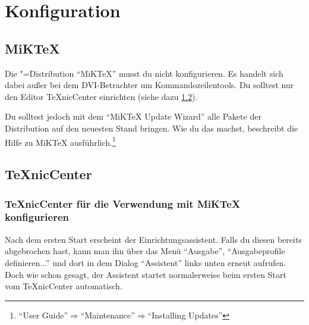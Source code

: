 %
%

\chapter{Konfiguration}

\section{MiKTeX}

Die \DMLLaTeX"=Distribution \enquote{MiKTeX} musst du nicht konfigurieren. Es handelt sich dabei außer bei dem DVI-Betrachter um Kommandozeilentools. Du solltest nur den Editor TeXnicCenter einrichten (siehe dazu \cref{sec:KonfigurationTeXnicCenter}).

Du solltest jedoch mit dem \enquote{MiKTeX Update Wizard} alle Pakete der Distribution auf den neuesten Stand bringen. Wie du das machst, beschreibt die Hilfe zu MiKTeX ausführlich.\footnote{\enquote{User Guide}$\Rightarrow$\enquote{Maintenance}$\Rightarrow$\enquote{Installing Updates}}

\section{TeXnicCenter}
\label{sec:KonfigurationTeXnicCenter}

\subsection{TeXnicCenter für die Verwendung mit MiKTeX konfigurieren}

Nach dem ersten Start erscheint der Einrichtungsassistent. Falls du diesen bereits abgebrochen hast, kann man ihn über das Menü \enquote{Ausgabe}, \enquote{Ausgabeprofile definieren...} und dort in dem Dialog \enquote{Assistent} links unten erneut aufrufen. Doch wie schon gesagt, der Assistent startet normalerweise beim ersten Start vom TeXnicCenter automatisch.

